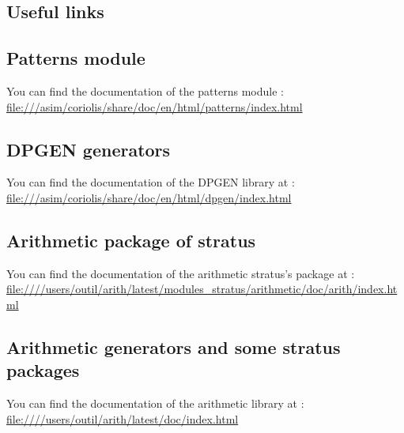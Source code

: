\documentclass[12pt]{article}
\begin{document}
\begin{htmlonly}

\section{Useful links}

    \subsection{Patterns module}
    
You can find the documentation of the patterns module :\\
\url{file:///asim/coriolis/share/doc/en/html/patterns/index.html}

    \subsection{DPGEN generators}
    
You can find the documentation of the DPGEN library at :\\
\url{file:///asim/coriolis/share/doc/en/html/dpgen/index.html}

    \subsection{Arithmetic package of stratus}

You can find the documentation of the arithmetic stratus's package at :\\
\url{file:////users/outil/arith/latest/modules_stratus/arithmetic/doc/arith/index.html}

    \subsection{Arithmetic generators and some stratus packages}

You can find the documentation of the arithmetic library at :\\
\url{file:////users/outil/arith/latest/doc/index.html}

\end{htmlonly}
\end{document}
